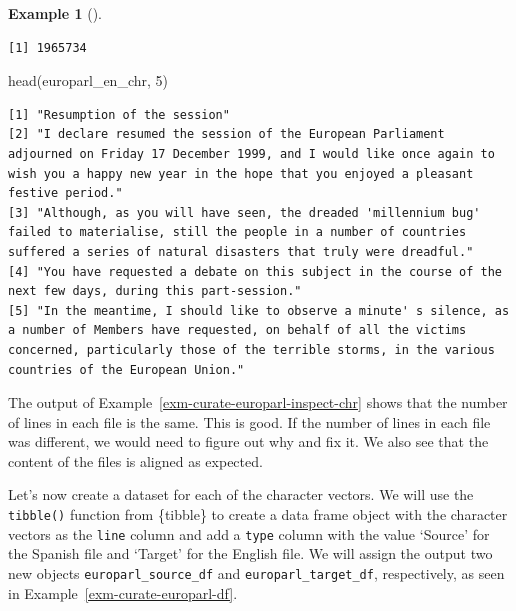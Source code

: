\documentclass[
  letterpaper,
]{book}
\newenvironment{Shaded}{\begin{snugshade}}{\end{snugshade}}
\newcommand{\DecValTok}[1]{\textcolor[rgb]{0.00,0.00,0.00}{#1}}
\newcommand{\FunctionTok}[1]{\textcolor[rgb]{0.00,0.00,0.00}{#1}}
\newcommand{\NormalTok}[1]{\textcolor[rgb]{0.00,0.00,0.00}{#1}}
\theoremstyle{definition}
\newtheorem{example}{Example}[chapter]
\theoremstyle{remark}
\begin{document}
\begin{example}[]
\begin{verbatim}
[1] 1965734
\end{verbatim}

\begin{Shaded}
\begin{Highlighting}[]
\FunctionTok{head}\NormalTok{(europarl\_en\_chr, }\DecValTok{5}\NormalTok{)}
\end{Highlighting}
\end{Shaded}

\begin{verbatim}
[1] "Resumption of the session"                                                                                                                                                                                                               
[2] "I declare resumed the session of the European Parliament adjourned on Friday 17 December 1999, and I would like once again to wish you a happy new year in the hope that you enjoyed a pleasant festive period."                         
[3] "Although, as you will have seen, the dreaded 'millennium bug' failed to materialise, still the people in a number of countries suffered a series of natural disasters that truly were dreadful."                                         
[4] "You have requested a debate on this subject in the course of the next few days, during this part-session."                                                                                                                               
[5] "In the meantime, I should like to observe a minute' s silence, as a number of Members have requested, on behalf of all the victims concerned, particularly those of the terrible storms, in the various countries of the European Union."
\end{verbatim}

\end{example}

The output of Example~\ref{exm-curate-europarl-inspect-chr} shows that
the number of lines in each file is the same. This is good. If the
number of lines in each file was different, we would need to figure out
why and fix it. We also see that the content of the files is aligned as
expected.

Let's now create a dataset for each of the character vectors. We will
use the \texttt{tibble()} function from \{tibble\} to create a data
frame object with the character vectors as the \texttt{line} column and
add a \texttt{type} column with the value `Source' for the Spanish file
and `Target' for the English file. We will assign the output two new
objects \texttt{europarl\_source\_df} and \texttt{europarl\_target\_df},
respectively, as seen in Example~\ref{exm-curate-europarl-df}.
\end{document}
